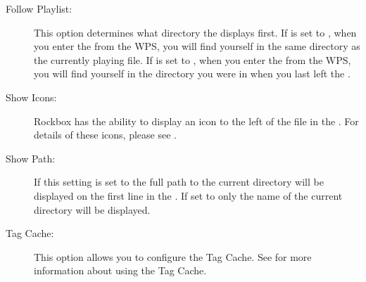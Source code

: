 \begin{description}
\begin{description}
  \end{description}
  
\item[Follow Playlist:] 
  This option determines what directory the  displays
  first. If  is set to , when you enter
  the  from the WPS, you will find yourself in the same
  directory as the currently playing file. If  is set
  to , when you enter the  from the WPS, you
  will find yourself in the directory you were in when you last left the
  .
  
\item[Show Icons:]
  Rockbox has the ability to display an icon to the left of the file
  in the . For details of these icons, please see
  .

\item[Show Path:]
  If this setting is set to  the full path to the current
  directory will be displayed on the first line in the .
  If set to  only the name of the current
  directory will be displayed.

\item[Tag Cache:]
  This option allows you to configure the Tag Cache.
  See  for more information about using
  the Tag Cache.
\end{description}
